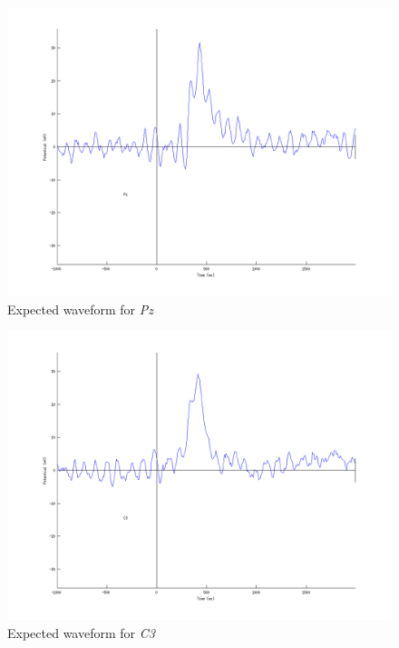 \documentclass{article}
\begin{document}
\begin{figure}
    \begin{center}
        \includegraphics[scale=0.5]{Pz.png}
        \caption{Expected waveform for \emph{Pz}}
    \end{center}
\end{figure}
\begin{figure}
    \begin{center}
        \includegraphics[scale=0.5]{C3.png}
        \caption{Expected waveform for \emph{C3}}
    \end{center}
\end{figure}
\end{document}
